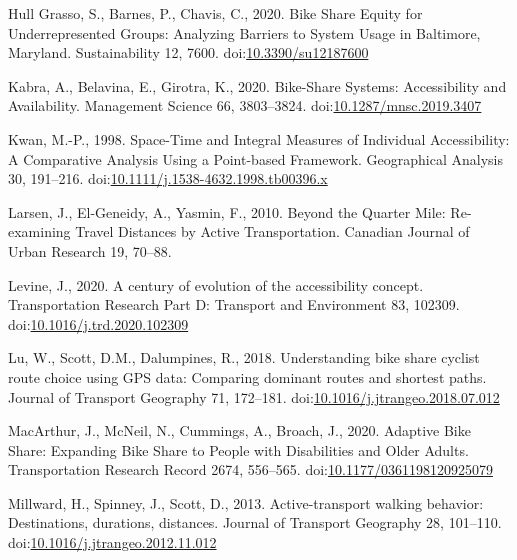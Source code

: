 \documentclass[]{elsarticle} %
\begin{document}
\leavevmode\hypertarget{ref-hullgrassoBikeShareEquity2020}{}%
Hull Grasso, S., Barnes, P., Chavis, C., 2020. Bike Share Equity for
Underrepresented Groups: Analyzing Barriers to System Usage in
Baltimore, Maryland. Sustainability 12, 7600.
doi:\href{https://doi.org/10.3390/su12187600}{10.3390/su12187600}

\leavevmode\hypertarget{ref-kabraBikeShareSystemsAccessibility2020}{}%
Kabra, A., Belavina, E., Girotra, K., 2020. Bike-Share Systems:
Accessibility and Availability. Management Science 66, 3803--3824.
doi:\href{https://doi.org/10.1287/mnsc.2019.3407}{10.1287/mnsc.2019.3407}

\leavevmode\hypertarget{ref-kwanSpaceTimeIntegral1998}{}%
Kwan, M.-P., 1998. Space-Time and Integral Measures of Individual
Accessibility: A Comparative Analysis Using a Point-based Framework.
Geographical Analysis 30, 191--216.
doi:\href{https://doi.org/10.1111/j.1538-4632.1998.tb00396.x}{10.1111/j.1538-4632.1998.tb00396.x}

\leavevmode\hypertarget{ref-larsenQuarterMileReexamining2010}{}%
Larsen, J., El-Geneidy, A., Yasmin, F., 2010. Beyond the Quarter Mile:
Re-examining Travel Distances by Active Transportation. Canadian Journal
of Urban Research 19, 70--88.

\leavevmode\hypertarget{ref-levineCenturyEvolutionAccessibility2020}{}%
Levine, J., 2020. A century of evolution of the accessibility concept.
Transportation Research Part D: Transport and Environment 83, 102309.
doi:\href{https://doi.org/10.1016/j.trd.2020.102309}{10.1016/j.trd.2020.102309}

\leavevmode\hypertarget{ref-luUnderstandingBikeShare2018}{}%
Lu, W., Scott, D.M., Dalumpines, R., 2018. Understanding bike share
cyclist route choice using GPS data: Comparing dominant routes and
shortest paths. Journal of Transport Geography 71, 172--181.
doi:\href{https://doi.org/10.1016/j.jtrangeo.2018.07.012}{10.1016/j.jtrangeo.2018.07.012}

\leavevmode\hypertarget{ref-macarthurAdaptiveBikeShare2020}{}%
MacArthur, J., McNeil, N., Cummings, A., Broach, J., 2020. Adaptive Bike
Share: Expanding Bike Share to People with Disabilities and Older
Adults. Transportation Research Record 2674, 556--565.
doi:\href{https://doi.org/10.1177/0361198120925079}{10.1177/0361198120925079}

\leavevmode\hypertarget{ref-millwardActivetransportWalkingBehavior2013}{}%
Millward, H., Spinney, J., Scott, D., 2013. Active-transport walking
behavior: Destinations, durations, distances. Journal of Transport
Geography 28, 101--110.
doi:\href{https://doi.org/10.1016/j.jtrangeo.2012.11.012}{10.1016/j.jtrangeo.2012.11.012}
\end{document}
